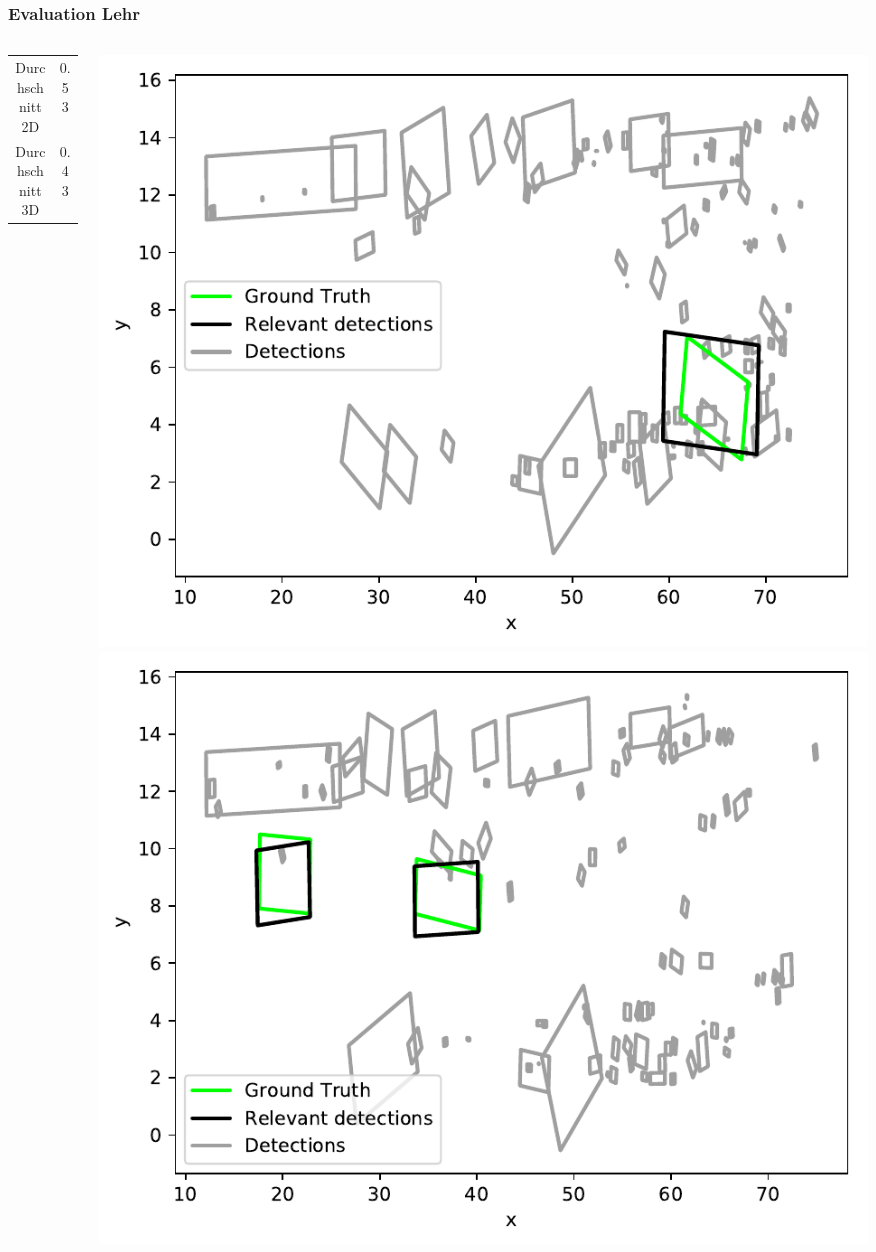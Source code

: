 \begin{frame}
    \frametitle{Evaluation Lehr}
    \begin{columns}
        \begin{column}{.5\textwidth}
            \begin{tabular}{cc}
                \toprule
                Durchschnitt 2D & 0.53\\
                Durchschnitt 3D & 0.43 \\
                \bottomrule
            \end{tabular}
        \end{column}
        \begin{column}{.5\textwidth}
            \includegraphics[width=\textwidth]{../Material/lehr1.pdf}
            \includegraphics[width=\textwidth]{../Material/lehr2.pdf}
        \end{column}
    \end{columns}
\end{frame}
